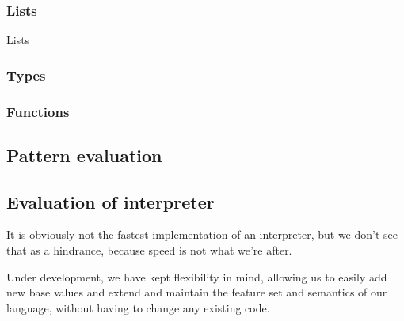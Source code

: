 \subsubsection{Lists}
Lists 

\subsubsection{Types}

\subsubsection{Functions}


\subsection{Pattern evaluation}

\subsection{Evaluation of interpreter}
It is obviously not the fastest implementation of an interpreter, but we don't see that as a hindrance, because speed is not what we're after.

Under development, we have kept flexibility in mind, allowing us to easily add new base values and extend and maintain the feature set and semantics of our language, without having to change any existing code.
